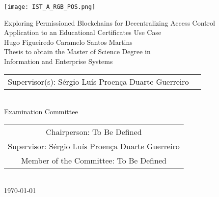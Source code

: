 \texttt{[image: IST\_A\_RGB\_POS.png]}

\begin{center}
    \vspace{2.5cm}

    \vspace{1.5cm}
    {\FontLb Exploring Permissioned Blockchains for Decentralizing Access Control} \\
    \vspace{0.3cm}
    {\FontMn Application to an Educational Certificates Use Case} \\
    \vspace{1.5cm}  
    {\FontMb Hugo Figueiredo Caramelo Santos Martins} \\
    \vspace{1.5cm}
    {\FontSn Thesis to obtain the Master of Science Degree in} \\
    \vspace{0.3cm}
    {\FontLb Information and Enterprise Systems} \\
    \vspace{1.5cm}
    {\FontSn %
        \begin{tabular}{ll}
            Supervisor(s): Sérgio Luís Proença Duarte Guerreiro
        \end{tabular} } \\
    \vspace{1.5cm}
    {\FontMb Examination Committee} \\
    \vspace{0.3cm}
    {\FontSn %
        \begin{tabular}{c}
            Chairperson:     To Be Defined \\ 
            Supervisor: Sérgio Luís Proença Duarte Guerreiro \\ 
            Member of the Committee: To Be Defined  
        \end{tabular} } \\
    \vspace*{\fill}
    {\FontMb \today}
\end{center}